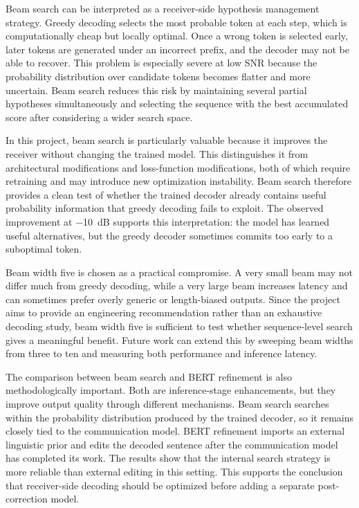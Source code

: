Beam search can be interpreted as a receiver-side hypothesis management strategy. Greedy decoding selects the most probable token at each step, which is computationally cheap but locally optimal. Once a wrong token is selected early, later tokens are generated under an incorrect prefix, and the decoder may not be able to recover. This problem is especially severe at low SNR because the probability distribution over candidate tokens becomes flatter and more uncertain. Beam search reduces this risk by maintaining several partial hypotheses simultaneously and selecting the sequence with the best accumulated score after considering a wider search space.

In this project, beam search is particularly valuable because it improves the receiver without changing the trained model. This distinguishes it from architectural modifications and loss-function modifications, both of which require retraining and may introduce new optimization instability. Beam search therefore provides a clean test of whether the trained decoder already contains useful probability information that greedy decoding fails to exploit. The observed improvement at \SI{-10}{dB} supports this interpretation: the model has learned useful alternatives, but the greedy decoder sometimes commits too early to a suboptimal token.

Beam width five is chosen as a practical compromise. A very small beam may not differ much from greedy decoding, while a very large beam increases latency and can sometimes prefer overly generic or length-biased outputs. Since the project aims to provide an engineering recommendation rather than an exhaustive decoding study, beam width five is sufficient to test whether sequence-level search gives a meaningful benefit. Future work can extend this by sweeping beam widths from three to ten and measuring both performance and inference latency.

The comparison between beam search and BERT refinement is also methodologically important. Both are inference-stage enhancements, but they improve output quality through different mechanisms. Beam search searches within the probability distribution produced by the trained decoder, so it remains closely tied to the communication model. BERT refinement imports an external linguistic prior and edits the decoded sentence after the communication model has completed its work. The results show that the internal search strategy is more reliable than external editing in this setting. This supports the conclusion that receiver-side decoding should be optimized before adding a separate post-correction model.

